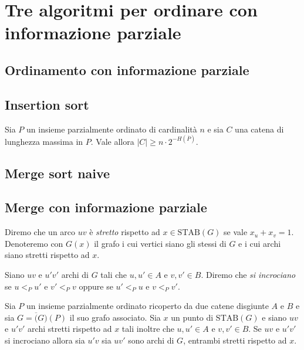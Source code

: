 \chapter{Tre algoritmi per ordinare con informazione parziale}

\section{Ordinamento con informazione parziale}

\section{Insertion sort} 
\begin{lemma}
	Sia \(P\) un insieme parzialmente ordinato di cardinalità \(n\) e sia \(C\) una catena di lunghezza massima in \(P\). Vale allora \(\left|C\right|\ge n\cdot2^{-H(\overline{P})}\). 
\end{lemma}

\section{Merge sort naive}

\section{Merge con informazione parziale}

\begin{definition}
  Diremo che un arco \(uv\) è \emph{stretto} rispetto ad \(x\in\text{STAB}(G)\) se vale \(x_u+x_v=1\). Denoteremo con \(G(x)\) il grafo i cui vertici siano gli stessi di \(G\) e i cui archi siano stretti rispetto ad \(x\).
\end{definition}

\begin{definition}
  Siano \(uv\) e \(u'v'\) archi di \(G\) tali che \(u,u'\in A\) e \(v,v'\in B\). Diremo che \emph{si incrociano} se \(u<_{P}u'\) e \(v'<_{P}v\) oppure se \(u'<_{P}u\) e \(v<_{P}v'\).
\end{definition}

\begin{lemma}
  Sia \(P\) un insieme parzialmente ordinato ricoperto da due catene disgiunte \(A\) e \(B\) e sia \(G=\overline(G)(P)\) il suo grafo associato. Sia \(x\) un punto di \(\text{STAB}(G)\) e siano \(uv\) e \(u'v'\) archi stretti rispetto ad \(x\) tali inoltre che \(u,u'\in A\) e \(v,v'\in B\). Se \(uv\) e \(u'v'\) si incrociano allora sia \(u'v\) sia \(uv'\) sono archi di \(G\), entrambi stretti rispetto ad \(x\).
\end{lemma}


